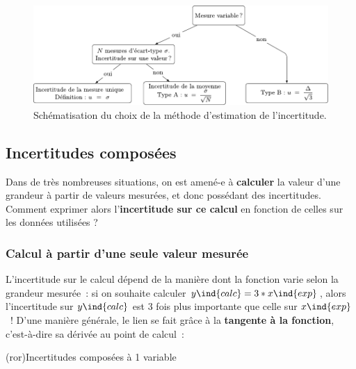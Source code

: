 \documentclass[../../main/main.tex]{subfiles}
\begin{document}
\begin{figure}[htbp!]
	\centering
	\includegraphics[width=\linewidth]{choix_incert}
	\caption{Schématisation du choix de la méthode d'estimation de l'incertitude.}
	\label{fig:choix_incert}
\end{figure}

\subsection{Incertitudes composées}
Dans de très nombreuses situations, on est amené-e à \textbf{calculer} la valeur
d'une grandeur à partir de valeurs mesurées, et donc possédant des incertitudes.
Comment exprimer alors l'\textbf{incertitude sur ce calcul} en fonction de
celles sur les données utilisées ?

\subsubsection{Calcul à partir d'une seule valeur mesurée}
L'incertitude sur le calcul dépend de la manière dont la fonction varie selon
la grandeur mesurée~: si on souhaite calculer $y\ind{calc} = 3*x\ind{exp}$, alors l'incertitude sur
$y\ind{calc}$ est 3 fois plus importante que celle sur $x\ind{exp}$~! D'une
manière générale, le lien se fait grâce à la \textbf{tangente à la fonction},
c'est-à-dire sa dérivée au point de calcul~:
\begin{tcb*}(ror){Incertitudes composées à 1 variable}
	\psw{%
		\[
			\boxed{y\ind{calc} = f(x\ind{mes}) \Ra u(y\ind{calc}) =
				\abs{\dv{f}{x}(x\ind{mes})}u(x\ind{mes})}
		\]
	}%
\end{tcb*}
\end{document}
